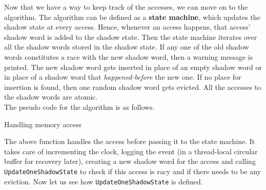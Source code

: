 \documentclass{btp}
\begin{document}
Now that we have a way to keep track of the accesses, we can move on to the algorithm. The algorithm can be defined as a \textbf{state machine}, which updates the shadow state at every access. Hence, whenever an access happens, that access' shadow word is added to the shadow state. Then the state machine iterates over all the shadow words stored in the shadow state. If any one of the old shadow words constitutes a race with the new shadow word, then a warning message is printed. The new shadow word gets inserted in place of an empty shadow word or in place of a shadow word that \textit{happened-before} the new one. If no place for insertion is found, then one random shadow word gets evicted. All the accesses to the shadow words are atomic.
\\
\newline
The pseudo code for the algorithm is as follows.
\\
\newline
\begin{algorithm}[H]
	\DontPrintSemicolon
	\SetNoFillComment

	\caption{Handling memory access}
\end{algorithm}
\vspace*{\baselineskip}
The above function handles the access before passing it to the state machine. It takes care of incrementing the clock, logging the event (in a thread-local circular buffer for recovery later), creating a new shadow word for the access and calling \texttt{UpdateOneShadowState} to check if this access is racy and if there needs to be any eviction. Now let us see how \texttt{UpdateOneShadowState} is defined.
\end{document}
